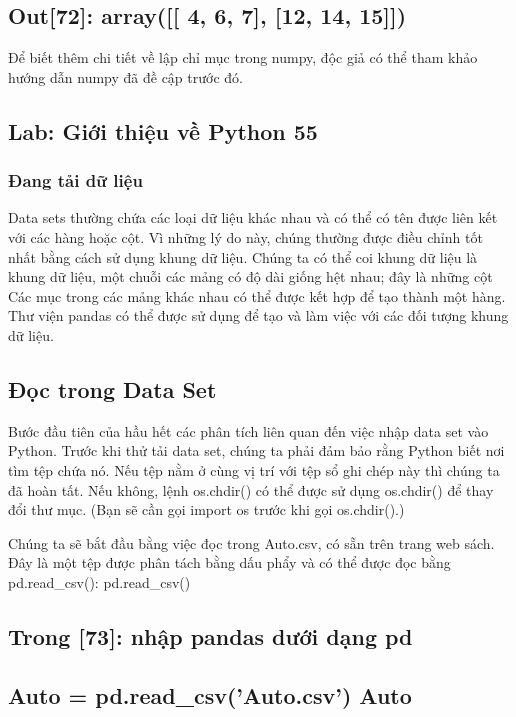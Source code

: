 \subsection{Out[72]: array([[ 4, 6, 7], [12, 14, 15]])}

Để biết thêm chi tiết về lập chỉ mục trong numpy, độc giả có thể tham khảo hướng dẫn numpy đã đề cập trước đó.

\subsection{Lab: Giới thiệu về Python 55}

\subsubsection{Đang tải dữ liệu}

Data sets thường chứa các loại dữ liệu khác nhau và có thể có tên được liên kết với các hàng hoặc cột. Vì những lý do này, chúng thường được điều chỉnh tốt nhất bằng cách sử dụng khung dữ liệu. Chúng ta có thể coi khung dữ liệu là khung dữ liệu, một chuỗi các mảng có độ dài giống hệt nhau; đây là những cột Các mục trong các mảng khác nhau có thể được kết hợp để tạo thành một hàng. Thư viện pandas có thể được sử dụng để tạo và làm việc với các đối tượng khung dữ liệu.

\subsection{Đọc trong Data Set}

Bước đầu tiên của hầu hết các phân tích liên quan đến việc nhập data set vào Python. Trước khi thử tải data set, chúng ta phải đảm bảo rằng Python biết nơi tìm tệp chứa nó. Nếu tệp nằm ở cùng vị trí với tệp sổ ghi chép này thì chúng ta đã hoàn tất. Nếu không, lệnh os.chdir() có thể được sử dụng os.chdir() để thay đổi thư mục. (Bạn sẽ cần gọi import os trước khi gọi os.chdir().)

Chúng ta sẽ bắt đầu bằng việc đọc trong Auto.csv, có sẵn trên trang web sách. Đây là một tệp được phân tách bằng dấu phẩy và có thể được đọc bằng pd.read\_csv(): pd.read\_csv()

\subsection{Trong [73]: nhập pandas dưới dạng pd}

\subsection{Auto = pd.read\_csv('Auto.csv') Auto}

